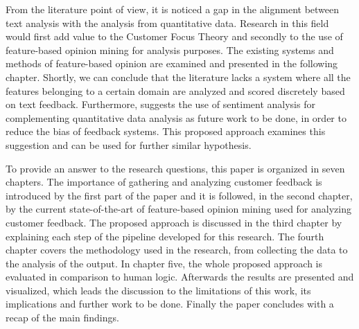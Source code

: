 From the literature point of view, it is noticed a gap in the alignment between text analysis with the analysis from quantitative data. Research in this field would first add value to the Customer Focus Theory and secondly to the use of feature-based opinion mining for analysis purposes. The existing systems and methods of feature-based opinion are examined and presented in the following chapter. Shortly, we can conclude that the literature lacks a system where all the features belonging to a certain domain are analyzed and scored discretely based on text feedback. Furthermore, \cite{fradkin2016bias}  suggests the use of sentiment analysis for complementing quantitative data analysis as future work to be done, in order to reduce the bias of feedback systems. This proposed approach examines this suggestion and can be used for further similar hypothesis.

To provide an answer to the research questions, this paper is organized in seven chapters. The importance of gathering and analyzing customer feedback is introduced by the first part of the paper and it is followed, in the second chapter, by the current state-of-the-art of feature-based opinion mining used for analyzing customer feedback. The proposed approach is discussed in the third chapter by explaining each step of the pipeline developed for this research. The fourth chapter covers the methodology used in the research, from collecting the data to the analysis of the output. In chapter five, the whole proposed approach is evaluated in comparison to human logic. Afterwards the results are presented and visualized, which leads the discussion to the limitations of this work, its implications and further work to be done. Finally the paper concludes with a recap of the main findings. 